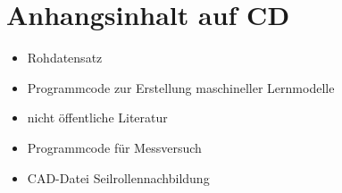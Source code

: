 \chapter*{Anhangsinhalt auf CD}
\begin{itemize}
    \item Rohdatensatz
    \item Programmcode zur Erstellung maschineller Lernmodelle
    \item nicht öffentliche Literatur
    \item Programmcode für Messversuch
    \item CAD-Datei Seilrollennachbildung
\end{itemize}